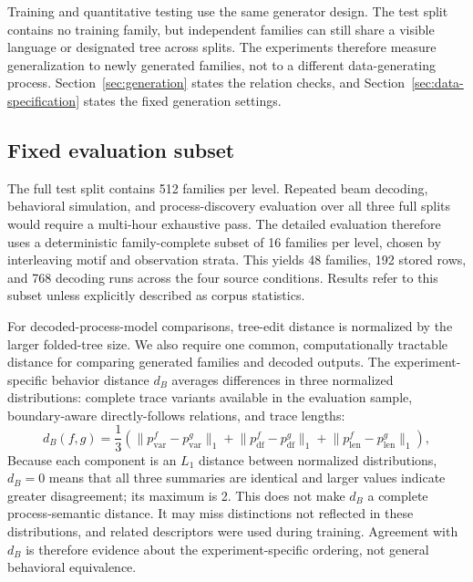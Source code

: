 \documentclass[pdflatex,sn-basic]{sn-jnl}
\begin{document}
Training and quantitative testing use the same generator design. The test split contains no training family, but independent families can still share a visible language or designated tree across splits. The experiments therefore measure generalization to newly generated families, not to a different data-generating process. Section~\ref{sec:generation} states the relation checks, and Section~\ref{sec:data-specification} states the fixed generation settings.

\subsection{Fixed evaluation subset}

The full test split contains 512 families per level. Repeated beam decoding, behavioral simulation, and process-discovery evaluation over all three full splits would require a multi-hour exhaustive pass. The detailed evaluation therefore uses a deterministic family-complete subset of 16 families per level, chosen by interleaving motif and observation strata. This yields 48 families, 192 stored rows, and 768 decoding runs across the four source conditions. Results refer to this subset unless explicitly described as corpus statistics.

For decoded-process-model comparisons, tree-edit distance is normalized by the larger folded-tree size. We also require one common, computationally tractable distance for comparing generated families and decoded outputs. The experiment-specific behavior distance $d_B$ averages differences in three normalized distributions: complete trace variants available in the evaluation sample, boundary-aware directly-follows relations, and trace lengths:
\begin{equation}
d_B(f,g)=\frac{1}{3}\left(
 \lVert p_{\mathrm{var}}^f-p_{\mathrm{var}}^g\rVert_1+
 \lVert p_{\mathrm{df}}^f-p_{\mathrm{df}}^g\rVert_1+
 \lVert p_{\mathrm{len}}^f-p_{\mathrm{len}}^g\rVert_1
\right),
\label{eq:behavior-distance}
\end{equation}
Because each component is an $L_1$ distance between normalized distributions, $d_B=0$ means that all three summaries are identical and larger values indicate greater disagreement; its maximum is 2. This does not make $d_B$ a complete process-semantic distance. It may miss distinctions not reflected in these distributions, and related descriptors were used during training. Agreement with $d_B$ is therefore evidence about the experiment-specific ordering, not general behavioral equivalence.
\end{document}
